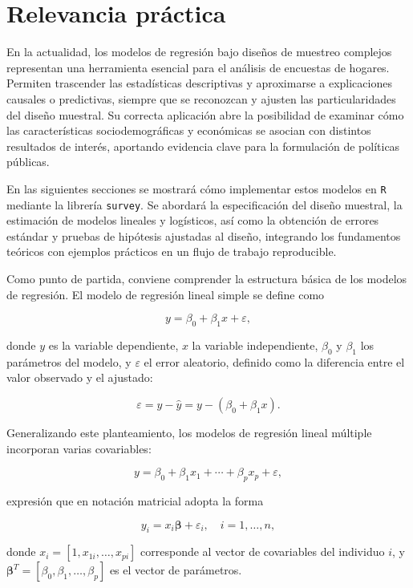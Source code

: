 \documentclass[
  spanish,
  12pt,
]{book}
\begin{document}
\section{Relevancia práctica}\label{relevancia-pruxe1ctica}

En la actualidad, los modelos de regresión bajo diseños de muestreo complejos representan una herramienta esencial para el análisis de encuestas de hogares. Permiten trascender las estadísticas descriptivas y aproximarse a explicaciones causales o predictivas, siempre que se reconozcan y ajusten las particularidades del diseño muestral. Su correcta aplicación abre la posibilidad de examinar cómo las características sociodemográficas y económicas se asocian con distintos resultados de interés, aportando evidencia clave para la formulación de políticas públicas.

En las siguientes secciones se mostrará cómo implementar estos modelos en \texttt{R} mediante la librería \texttt{survey}. Se abordará la especificación del diseño muestral, la estimación de modelos lineales y logísticos, así como la obtención de errores estándar y pruebas de hipótesis ajustadas al diseño, integrando los fundamentos teóricos con ejemplos prácticos en un flujo de trabajo reproducible.

Como punto de partida, conviene comprender la estructura básica de los modelos de regresión. El modelo de regresión lineal simple se define como

\[
y = \beta_{0} + \beta_{1}x + \varepsilon,
\]

donde \(y\) es la variable dependiente, \(x\) la variable independiente, \(\beta_{0}\) y \(\beta_{1}\) los parámetros del modelo, y \(\varepsilon\) el error aleatorio, definido como la diferencia entre el valor observado y el ajustado:

\[
\varepsilon = y - \hat{y} = y - (\beta_{0} + \beta_{1}x).
\]

Generalizando este planteamiento, los modelos de regresión lineal múltiple incorporan varias covariables:

\[
y = \beta_{0} + \beta_{1}x_{1} + \cdots + \beta_{p}x_{p} + \varepsilon,
\]

expresión que en notación matricial adopta la forma

\[
y_{i} = x_{i}\boldsymbol{\beta} + \varepsilon_{i}, \quad i=1,\ldots,n,
\]

donde \(x_{i} = [1, x_{1i}, \ldots, x_{pi}]\) corresponde al vector de covariables del individuo \(i\), y \(\boldsymbol{\beta}^{T} = [\beta_{0}, \beta_{1}, \ldots, \beta_{p}]\) es el vector de parámetros.
\end{document}
